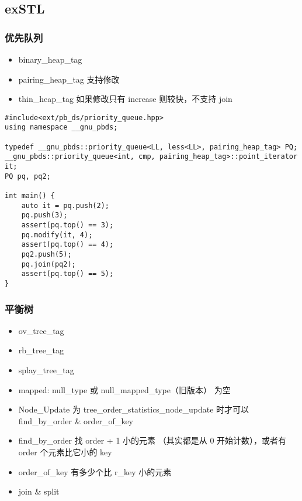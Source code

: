 \documentclass[]{article}
\providecommand{\tightlist}{%
  \setlength{\itemsep}{0pt}\setlength{\parskip}{0pt}}
\begin{document}
\hypertarget{exstl}{%
\subsection{exSTL}\label{exstl}}

\hypertarget{ux4f18ux5148ux961fux5217}{%
\subsubsection{优先队列}\label{ux4f18ux5148ux961fux5217}}

\begin{itemize}
\tightlist
\item
  binary\_heap\_tag
\item
  pairing\_heap\_tag 支持修改
\item
  thin\_heap\_tag 如果修改只有 increase 则较快，不支持 join
\end{itemize}

\begin{verbatim}
#include<ext/pb_ds/priority_queue.hpp>
using namespace __gnu_pbds;

typedef __gnu_pbds::priority_queue<LL, less<LL>, pairing_heap_tag> PQ;
__gnu_pbds::priority_queue<int, cmp, pairing_heap_tag>::point_iterator it;
PQ pq, pq2;

int main() {
    auto it = pq.push(2);
    pq.push(3);
    assert(pq.top() == 3);
    pq.modify(it, 4);
    assert(pq.top() == 4);
    pq2.push(5);
    pq.join(pq2);
    assert(pq.top() == 5);
}
\end{verbatim}

\hypertarget{ux5e73ux8861ux6811}{%
\subsubsection{平衡树}\label{ux5e73ux8861ux6811}}

\begin{itemize}
\item
  ov\_tree\_tag
\item
  rb\_tree\_tag
\item
  splay\_tree\_tag
\item
  mapped: null\_type 或 null\_mapped\_type（旧版本） 为空
\item
  Node\_Update 为 tree\_order\_statistics\_node\_update 时才可以
  find\_by\_order \& order\_of\_key
\item
  find\_by\_order 找 order + 1 小的元素 （其实都是从 0
  开始计数），或者有 order 个元素比它小的 key
\item
  order\_of\_key 有多少个比 r\_key 小的元素
\item
  join \& split
\end{itemize}
\end{document}
